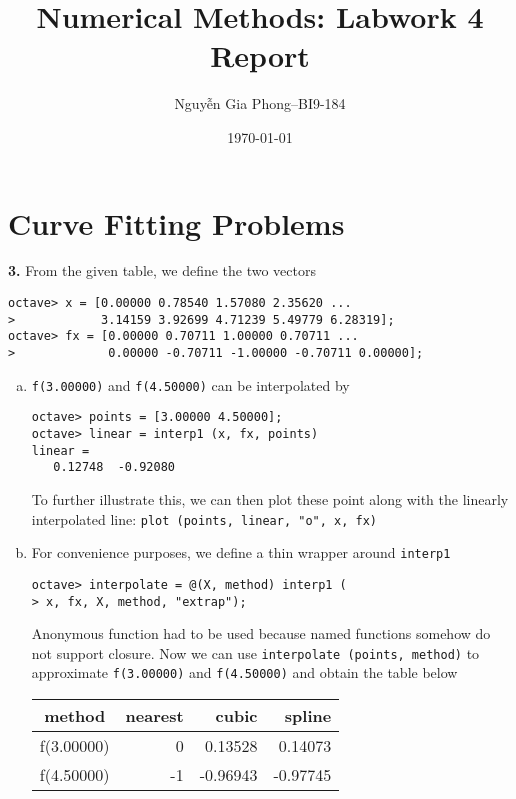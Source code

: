 \documentclass[a4paper,12pt]{article}
\title{Numerical Methods: Labwork 4 Report}
\author{Nguyễn Gia Phong--BI9-184}
\date{\dateenglish\today}
\newcommand{\exercise}[1]{\noindent\textbf{#1.}}
\begin{document}
\maketitle
\section{Curve Fitting Problems}
\exercise{3}  From the given table, we define the two vectors
\begin{verbatim}
octave> x = [0.00000 0.78540 1.57080 2.35620 ...
>            3.14159 3.92699 4.71239 5.49779 6.28319];
octave> fx = [0.00000 0.70711 1.00000 0.70711 ...
>             0.00000 -0.70711 -1.00000 -0.70711 0.00000];
\end{verbatim}

\begin{enumerate}[(a)]
  \item \verb|f(3.00000)| and \verb|f(4.50000)| can be interpolated by
\begin{verbatim}
octave> points = [3.00000 4.50000];
octave> linear = interp1 (x, fx, points)
linear =
   0.12748  -0.92080
\end{verbatim}
    To further illustrate this, we can then plot these point along
    with the linearly interpolated line:
    \verb|plot (points, linear, "o", x, fx)|
    \begin{figure}[!h]
      \centering
      \scalebox{0.36}{}
    \end{figure}

  \item For convenience purposes, we define a thin wrapper around \verb|interp1|
\begin{verbatim}
octave> interpolate = @(X, method) interp1 (
> x, fx, X, method, "extrap");
\end{verbatim}
    Anonymous function had to be used because named functions somehow do not
    support closure.  Now we can use \verb|interpolate (points, method)|
    to approximate \verb|f(3.00000)| and \verb|f(4.50000)|
    and obtain the table below
    \begin{center}
      \begin{tabular}{c r r r}
        \toprule
        method & nearest & cubic & spline \\
        \midrule
        f(3.00000) & 0 & 0.13528 & 0.14073 \\
        f(4.50000) & -1 & -0.96943 & -0.97745\\
        \bottomrule
      \end{tabular}
    \end{center}


\end{enumerate}
\end{document}

